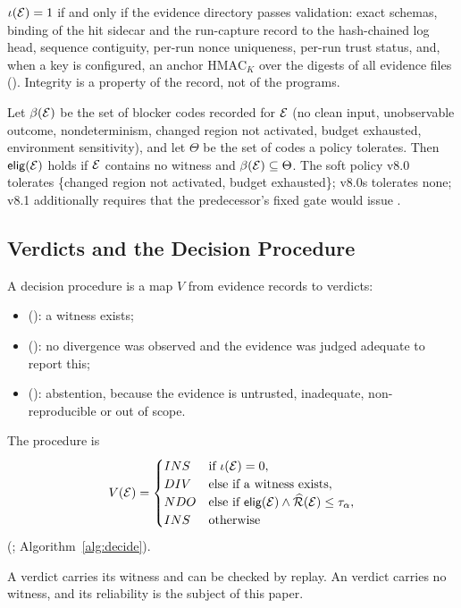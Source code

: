\begin{definition}[Integrity]
$\iota(\mathcal{E})=1$ if and only if the evidence directory passes validation: exact schemas, binding of the hit sidecar and the run-capture record to the hash-chained log head, sequence contiguity, per-run nonce uniqueness, per-run trust status, and, when a key is configured, an anchor $\mathrm{HMAC}_K$ over the digests of all evidence files (). Integrity is a property of the record, not of the programs.
\end{definition}

\begin{definition}[Eligibility]
Let $\beta(\mathcal{E})$ be the set of blocker codes recorded for $\mathcal{E}$ (no clean input, unobservable outcome, nondeterminism, changed region not activated, budget exhausted, environment sensitivity), and let $\Theta$ be the set of codes a policy tolerates. Then $\textsf{elig}(\mathcal{E})$ holds if $\mathcal{E}$ contains no witness and $\beta(\mathcal{E})\subseteq\Theta$. The soft policy v8.0 tolerates \{changed region not activated, budget exhausted\}; v8.0s tolerates none; v8.1 additionally requires that the predecessor's fixed gate would issue \NDO{}.
\end{definition}

\subsection{Verdicts and the Decision Procedure}
\begin{definition}
A decision procedure is a map $V$ from evidence records to verdicts:
\begin{itemize}
\item \DIVfull{} (\DIV{}): a witness exists;
\item \NDOfull{} (\NDO{}): no divergence was observed and the evidence was judged adequate to report this;
\item \INSfull{} (\INS{}): abstention, because the evidence is untrusted, inadequate, non-reproducible or out of scope.
\end{itemize}
The \sbg{} procedure is
\begin{equation}
V(\mathcal{E})=\begin{cases}
INS{} & \text{if } \iota(\mathcal{E})=0,\\
DIV{} & \text{else if a witness exists},\\
NDO{} & \text{else if } \textsf{elig}(\mathcal{E})\wedge\widehat{\mathcal{R}}(\mathcal{E})\le\tau_\alpha,\\
INS{} & \text{otherwise}
\end{cases}
\label{eq:V}
\end{equation}
(; Algorithm~\ref{alg:decide}).
\end{definition}
A \DIV{} verdict carries its witness and can be checked by replay. An \NDO{} verdict carries no witness, and its reliability is the subject of this paper.

